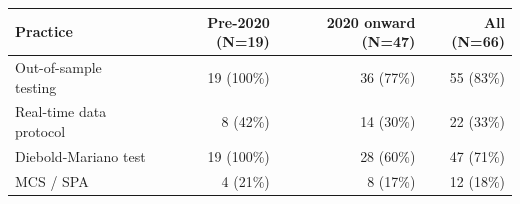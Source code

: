 \documentclass[preview]{standalone}
\begin{document}
\begin{tabular}{|l|r|r|r|}
\hline
\textbf{Practice} & \textbf{Pre-2020 (N=19)} & \textbf{2020 onward (N=47)} & \textbf{All (N=66)} \\
\hline
Out-of-sample testing   & 19 (100\%) & 36 (77\%)  & 55 (83\%) \\
Real-time data protocol & 8  (42\%)  & 14 (30\%)  & 22 (33\%) \\
Diebold-Mariano test    & 19 (100\%) & 28 (60\%)  & 47 (71\%) \\
MCS / SPA               & 4  (21\%)  & 8  (17\%)  & 12 (18\%) \\
\hline
\end{tabular}
\end{document}
